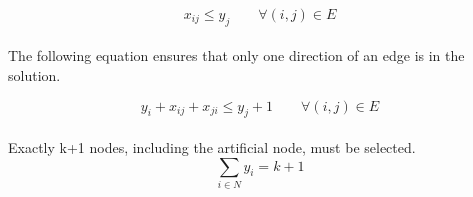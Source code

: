 \begin{equation}
  x_{ij} \leq y_{j} \qquad \forall (i,j) \in E
  \label{lbl:xy2}
\end{equation}
\\
The following equation ensures that only one direction of an edge is in the solution.

\begin{equation}
 y_{i} + x_{ij} + x_{ji} \leq y_{j} + 1 \qquad \forall (i,j) \in E
 \label{lbl:xy3}
\end{equation}
\\
Exactly k+1 nodes, including the artificial node, must be selected.
\begin{equation}
  \sum_{i \in N} y_i = k + 1
  \label{lbl:yk}
\end{equation}
